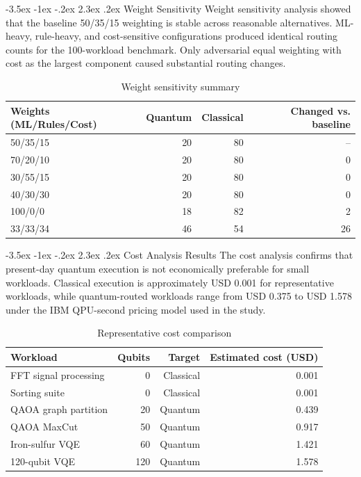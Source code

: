 \documentclass[12pt,a4paper]{report}
\makeatletter
\renewcommand\section{\@startsection{section}{1}{\z@}%
  {-3.5ex \@plus -1ex \@minus -.2ex}%
  {2.3ex \@plus.2ex}%
  {\normalfont\bfseries\fontsize{12pt}{16pt}\selectfont}}
\makeatother
\begin{document}
\section{Weight Sensitivity}
Weight sensitivity analysis showed that the baseline 50/35/15 weighting is stable across reasonable alternatives. ML-heavy, rule-heavy, and cost-sensitive configurations produced identical routing counts for the 100-workload benchmark. Only adversarial equal weighting with cost as the largest component caused substantial routing changes.

\begin{table}[H]
\centering
\caption{Weight sensitivity summary}
\begin{tabular}{lrrr}
\toprule
\textbf{Weights (ML/Rules/Cost)} & \textbf{Quantum} & \textbf{Classical} & \textbf{Changed vs. baseline} \\
\midrule
50/35/15 & 20 & 80 & -- \\
70/20/10 & 20 & 80 & 0 \\
30/55/15 & 20 & 80 & 0 \\
40/30/30 & 20 & 80 & 0 \\
100/0/0 & 18 & 82 & 2 \\
33/33/34 & 46 & 54 & 26 \\
\bottomrule
\end{tabular}
\end{table}

\section{Cost Analysis Results}
The cost analysis confirms that present-day quantum execution is not economically preferable for small workloads. Classical execution is approximately USD 0.001 for representative workloads, while quantum-routed workloads range from USD 0.375 to USD 1.578 under the IBM QPU-second pricing model used in the study.

\begin{table}[H]
\centering
\caption{Representative cost comparison}
\begin{tabular}{lrrr}
\toprule
\textbf{Workload} & \textbf{Qubits} & \textbf{Target} & \textbf{Estimated cost (USD)} \\
\midrule
FFT signal processing & 0 & Classical & 0.001 \\
Sorting suite & 0 & Classical & 0.001 \\
QAOA graph partition & 20 & Quantum & 0.439 \\
QAOA MaxCut & 50 & Quantum & 0.917 \\
Iron-sulfur VQE & 60 & Quantum & 1.421 \\
120-qubit VQE & 120 & Quantum & 1.578 \\
\bottomrule
\end{tabular}
\end{table}
\end{document}
